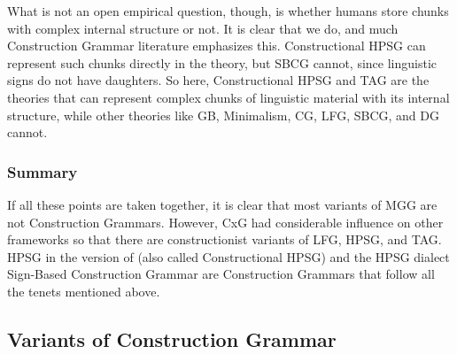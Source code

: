 \documentclass[output=paper
	        ,collection
	        ,collectionchapter
 	        ,biblatex
                ,babelshorthands
                ,newtxmath
                ,draftmode
                ,colorlinks, citecolor=brown
]{langscibook}
\begin{document}
What is not an open empirical question, though, is whether humans store chunks with complex internal
structure or not. It is clear that we do, and much Construction Grammar literature emphasizes
this. Constructional HPSG can represent such chunks directly in the theory, but SBCG cannot, since
linguistic signs do not have daughters. So here, Constructional HPSG and TAG are the theories that
can represent complex chunks of linguistic material with its internal structure, while other
theories like GB, Minimalism, CG, LFG, SBCG, and DG cannot.

\subsubsection{Summary}

If all these points are taken together, it is clear that most variants of MGG are not Construction
Grammars. However, CxG had considerable influence on other frameworks so that there are
constructionist variants of LFG, HPSG, and TAG. HPSG in the version of \citet{Sag97a} (also called
Constructional HPSG) and the HPSG dialect Sign-Based Construction Grammar are Construction Grammars
that follow all the tenets mentioned above.


\subsection{Variants of Construction Grammar}
\end{document}
